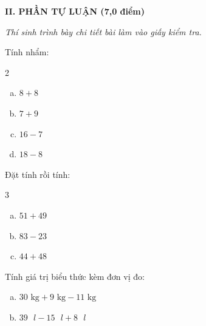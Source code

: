 \vspace{4mm}
\textbf{\large II. PHẦN TỰ LUẬN (7,0 điểm)}

{\itshape Thí sinh trình bày chi tiết bài làm vào giấy kiểm tra.}

\begin{bt}[1,0 điểm]
Tính nhẩm:
\begin{multicols}{2}
\begin{enumerate}[a)]
  \item $8 + 8$
  \item $7 + 9$
  \item $16 - 7$
  \item $18 - 8$
\end{enumerate}
\end{multicols}
\end{bt}

\begin{bt}[1,5 điểm]
Đặt tính rồi tính:
\begin{multicols}{3}
\begin{enumerate}[a)]
  \item $51 + 49$
  \item $83 - 23$
  \item $44 + 48$
\end{enumerate}
\end{multicols}
\end{bt}

\begin{bt}[1,0 điểm]
Tính giá trị biểu thức kèm đơn vị đo:
\begin{enumerate}[a)]
  \item $30\text{ kg} + 9\text{ kg} - 11\text{ kg}$
  \item $39\text{ }l - 15\text{ }l + 8\text{ }l$
\end{enumerate}
\end{bt}


